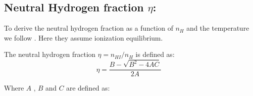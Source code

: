 \documentclass[a4,useAMS,usenatbib,usegraphicx]{mn2e}
\begin{document}







\subsection{Neutral Hydrogen fraction $\eta$:}\label{sec:eta}

To derive the neutral hydrogen fraction as a function of $n_H$ and the
temperature we follow \citep{Rahmati13}. Here they assume ionization equilibrium.

The neutral hydrogen fraction $\eta = n_{HI} / n_H$
is defined as:\\

\begin{equation}\label{eq:eta}
\eta = \dfrac{B - \sqrt{B^2 - 4AC}}{2A}
\end{equation}

Where $A$ , $B$ and $C$ are defined as:
\end{document}
